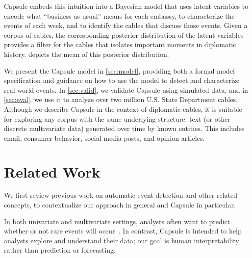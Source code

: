 Capsule embeds this intuition into a Bayesian model that uses latent
variables to encode what ``business as usual'' means for each embassy,
to characterize the events of each week, and to identify the cables
that discuss those events. Given a corpus of cables, the corresponding
posterior distribution of the latent variables provides a filter for
the cables that isolates important moments in diplomatic
history.  depicts the mean of this posterior
distribution.

We present the Capsule model in \cref{sec:model}, providing both a
formal model specification and guidance on how to use the model to
detect and characterize real-world events. In \cref{sec:valid}, we
validate Capsule using simulated data, and in \cref{sec:eval},
we use it to analyze over two million U.S. State Department
cables. Although we describe Capsule in the context of diplomatic
cables, it is suitable for exploring any corpus with the same
underlying structure: text (or other discrete multivariate data)
generated over time by known entities. This includes email, consumer
behavior, social media posts, and opinion articles.

\section{Related Work}



We first review previous work on automatic event detection and other
related concepts, to contextualize our approach in general and Capsule
in particular.


In both univariate and multivariate settings, analysts often want to
predict whether or not rare events will
occur~\cite{weiss1998learning,das2008anomaly}. In contrast, Capsule is
intended to help analysts explore and understand their data; our goal
is human interpretability rather than prediction or forecasting.

